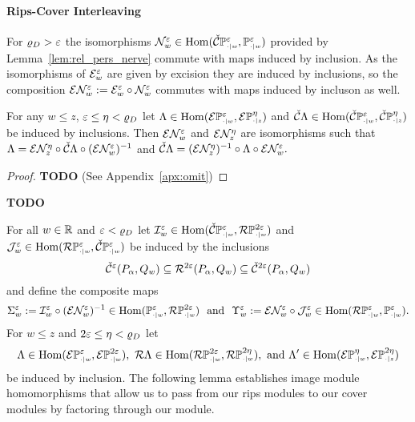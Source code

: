
\paragraph{Rips-Cover Interleaving}

For $\varrho_D > \e$ the isomorphisms $\N_w^\e\in\Hom(\CPP{w}{\e}, \PP{w}{\e})$ provided by Lemma~\ref{lem:rel_pers_nerve} commute with maps induced by inclusion.
As the isomorphisms of $\E_w^\e$ are given by excision they are induced by inclusions, so the composition $\E\N_w^\e := \E_w^\e\circ \N_w^\e$ commutes with maps induced by incluson as well.

\begin{lemma}\label{cor:excisive_nerve}
  For any $w\leq z$, $\e\leq \eta < \varrho_D$ let $\Lambda\in\Hom(\E\PP{w}{\e},\E\PP{z}{\eta})$ and $\cech\Lambda\in\Hom(\CPP{w}{\e},\CPP{z}{\eta})$ be induced by inclusions.
  Then $\E\N_w^\e$ and $\E\N_z^\eta$ are isomorphisms such that $\Lambda = \E\N_{z}^{\eta}\circ \cech\Lambda\circ (\E\N_w^\e)^{-1}$ and $\cech\Lambda = (\E\N_{z}^{\eta})^{-1}\circ \Lambda\circ \E\N_w^\e.$
\end{lemma}
\begin{proof}\textbf{TODO}
  (See Appendix~\ref{apx:omit})
\end{proof}
\proofatend
  \textbf{TODO}
\endproofatend

For all $w\in\R$ and $\e < \varrho_D$ let $\I_w^\e\in\Hom(\CPP{w}{\e}, \RPP{w}{2\e})$ and $\J_w^\e\in\Hom(\RPP{w}{\e},\CPP{w}{\e})$ be induced by the inclusions
\[ \cech^\e(P_\alpha, Q_w)\subseteq \rips^{2\e}(P_\alpha,Q_w)\subseteq \cech^{2\e}(P_\alpha, Q_w)\]
and define the composite maps
\[\Sigma_w^\e := \I_w^\e\circ (\E\N_w^\e)^{-1}\in \Hom(\PP{w}{\e},\RPP{w}{2\e})\ \text{ and }\ \Upsilon_w^\e := \E\N_w^{\e}\circ \J_w^{\e}\in \Hom(\RPP{w}{\e},\PP{w}{\e}).\]
For $w \leq z$ and $2\e\leq \eta < \varrho_D$ let
\[ \Lambda\in\Hom(\ext{\PP{w}{\e}}, \ext{\PP{w}{2\e}}),\ \rips\Lambda\in\Hom(\RPP{w}{2\e},\RPP{w}{2\eta}),\text{ and } \Lambda'\in\Hom(\ext{\PP{w}{\eta}},\ext{\PP{z}{2\eta}})\]
be induced by inclusion.
The following lemma establishes image module homomorphisms that allow us to pass from our rips modules to our cover modules by factoring through our \Cech module.

